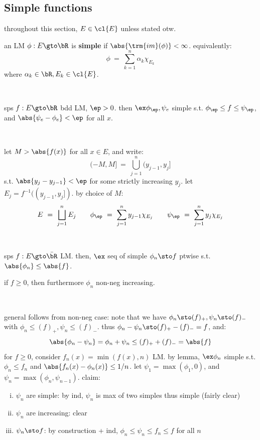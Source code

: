 \subsection{Simple functions}
throughout this section, $E\in\cl{E}$ unless stated otw.

\begin{defn}
	an LM $\phi:E\gto\bR$ is \textbf{simple} if $\abs{\trm{im}(\phi)}<\infty$.
	equivalently:
	\begin{equation*}
		\phi \ = \ \sum_{k=1}^{n}\alpha_{k}\chi_{E_{k}}
	\end{equation*}
	where $\alpha_{k}\in\bR,E_{k}\in\cl{E}$.
\end{defn} \

\begin{lm}
	sps $f:E\gto\bR$ bdd LM, $\ep>0$.
	then $\ex\phi_{\ep},\psi_{e}$ simple s.t. $\phi_{\ep}\leq f\leq\psi_{\ep}$,
	and $\abs{\psi_{e}-\phi_{e}}<\ep$ for all $x$.
\end{lm} \

\begin{pf}
	let $M>\abs{f(x)}$ for all $x\in E$, and write:
	\begin{equation*}
		(-M,M] \ = \ \bigcup_{j=1}^{n}(y_{j-1},y_{j}]
	\end{equation*}
	s.t. $\abs{y_{j}-y_{j-1}}<\ep$ for some strictly increasing $y_{j}$.
	let $E_{j}=f^{-1}((y_{j-1},y_{j}])$.
	by choice of $M$:
	\begin{equation*}
		E \ = \ \bigsqcup_{j=1}^{n}E_{j} \qquad
		\phi_{\ep} \ = \ \sum_{j=1}^{n}y_{j-1}\chi_{E_{j}} \qquad
		\psi_{\ep} \ = \ \sum_{j=1}^{n}y_{j}\chi_{E_{j}}
	\end{equation*}
\end{pf} \

\begin{lm}
	sps $f:E\gto\bar{\bR}$ LM.
	then, $\ex$ seq of simple $\phi_{n}\sto f$ ptwise s.t. $\abs{\phi_{n}}\leq\abs{f}$.

	if $f\geq0$, then furthermore $\phi_{n}$ non-neg increasing.
\end{lm} \

\begin{pf}
	general follows from non-neg case:
	note that we have $\phi_{n}\sto(f)_{+},\psi_{n}\sto(f)_{-}$ with
	$\phi_{n}\leq(f)_{+},\psi_{n}\leq(f)_{-}$.
	thus $\phi_{n}-\psi_{n}\sto(f)_{+}-(f)_{-}=f$, and:
	\begin{equation*}
		\abs{\phi_{n}-\psi_{n}}=\phi_{n}+\psi_{n}\leq(f)_{+}+(f)_{-}=\abs{f}
	\end{equation*}
	for $f\geq0$, consider $f_{n}(x)=\min(f(x),n)$ LM.
	by lemma, $\ex\phi_{n}$ simple s.t. $\phi_{n}\leq f_{n}$ and $\abs{f_{n}(x)-\phi_{n}(x)}\leq1/n$.
	let $\psi_{1}=\max(\phi_{1},0)$, and $\psi_{n}=\max(\phi_{n},\psi_{n-1})$.
	claim:
	\begin{enumerate}[i)]
		\item $\psi_{n}$ are simple:
			by ind, $\psi_{n}$ is max of two simples thus simple
			(fairly clear)
		\item $\psi_{n}$ are increasing: clear
		\item $\psi_{n}\sto f$:
			by construction + ind, $\phi_{n}\leq\psi_{n}\leq f_{n}\leq f$ for all $n$
	\end{enumerate}
\end{pf}
